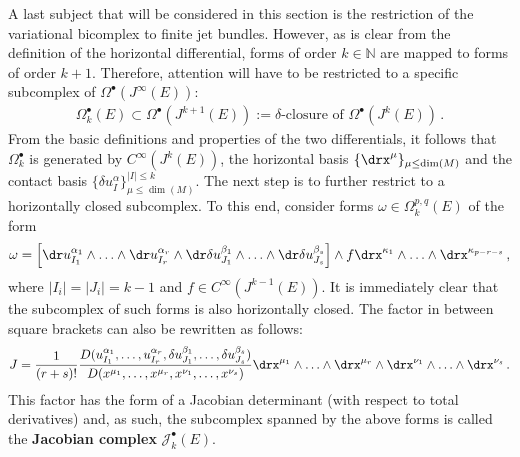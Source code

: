     A last subject that will be considered in this section is the restriction of the variational bicomplex to finite jet bundles. However, as is clear from the definition of the horizontal differential, forms of order $k\in\mathbb{N}$ are mapped to forms of order $k+1$. Therefore, attention will have to be restricted to a specific subcomplex of $\Omega^\bullet(J^\infty(E))$:
    \begin{gather}
        \Omega^\bullet_k(E)\subset\Omega^\bullet(J^{k+1}(E)) := \delta\text{-closure of }\Omega^\bullet(J^k(E))\,.
    \end{gather}
    From the basic definitions and properties of the two differentials, it follows that $\Omega^\bullet_k$ is generated by $C^\infty(J^k(E))$, the horizontal basis $\{\drx^\mu\}_{\mu\leq\dim(M)}$ and the contact basis $\{\delta u^\alpha_I\}_{\mu\leq\dim(M)}^{|I|\leq k}$.
    The next step is to further restrict to a horizontally closed subcomplex. To this end, consider forms $\omega\in\Omega^{p,q}_k(E)$ of the form
    \begin{gather}
        \omega = \left[\dr u^{\alpha_1}_{I_1}\wedge\ldots\wedge \dr u^{\alpha_r}_{I_r}\wedge\dr\delta u^{\beta_1}_{J_1}\wedge\ldots\wedge\dr\delta u^{\beta_s}_{J_s}\right]\wedge f\drx^{\kappa_1}\wedge\ldots\wedge \drx^{\kappa_{p-r-s}}\,,
    \end{gather}
    where $|I_i|=|J_i|=k-1$ and $f\in C^\infty(J^{k-1}(E))$. It is immediately clear that the subcomplex of such forms is also horizontally closed. The factor in between square brackets can also be rewritten as follows:
    \begin{gather}
        J = \frac{1}{(r+s)!}\frac{D(u^{\alpha_1}_{I_1},\ldots,u^{\alpha_r}_{I_r},\delta u^{\beta_1}_{J_1},\ldots,\delta u^{\beta_s}_{J_s})}{D(x^{\mu_1},\ldots,x^{\mu_r},x^{\nu_1},\ldots,x^{\nu_s})}\drx^{\mu_1}\wedge\ldots\wedge\drx^{\mu_r}\wedge\drx^{\nu_1}\wedge\ldots\wedge\drx^{\nu_s}\,.
    \end{gather}
    This factor has the form of a Jacobian determinant (with respect to total derivatives) and, as such, the subcomplex spanned by the above forms is called the \textbf{Jacobian complex} $\mathcal{J}^\bullet_k(E)$.


